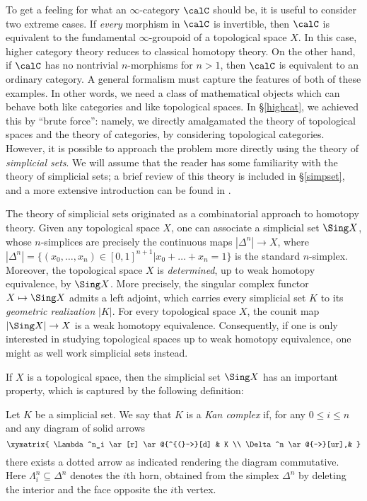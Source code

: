 To get a feeling for what an $\infty$-category $\calC$ should be, it is useful to consider two extreme cases. If {\em every} morphism in $\calC$ is invertible, then $\calC$ is equivalent to the fundamental $\infty$-groupoid of a topological space $X$. In this case, higher category theory reduces to classical homotopy theory. On the other hand, if $\calC$ has no nontrivial $n$-morphisms for $n > 1$, then $\calC$ is equivalent to an ordinary category. A general formalism must capture the features of both of these examples. In other words, we need
a class of mathematical objects which can behave both like categories and like topological spaces. In \S \ref{highcat}, we achieved this by ``brute force'': namely, we directly amalgamated the theory of topological spaces and the theory of categories, by considering topological categories.
However, it is possible to approach the problem more directly using the theory of
{\em simplicial sets}. 
We will assume that the reader has some familiarity with the theory of simplicial sets; a brief review of this theory is included in \S \ref{simpset}, and a more extensive introduction can be found in \cite{goerssjardine}.

The theory of simplicial sets originated as a combinatorial approach to homotopy theory. Given any topological space $X$, one can associate a simplicial set $\Sing X$, whose $n$-simplices are precisely the continuous maps $| \Delta^n | \rightarrow X$, where $|\Delta^n| = \{ (x_0, \ldots, x_n) \in [0,1]^{n+1} | x_0 + \ldots + x_n =1 \}$ is the standard $n$-simplex. Moreover, the topological space $X$ is {\em determined}, up to weak homotopy equivalence, by $\Sing X$. More precisely, the singular complex functor $X \mapsto \Sing X$
admits a left adjoint, which carries every simplicial set $K$ to its {\it geometric realization} $|K|$. For every topological space $X$, the counit map  $| \Sing X | \rightarrow X$ is a weak homotopy equivalence. Consequently, if one is only interested in studying topological spaces up to weak homotopy equivalence, one might as well work simplicial sets instead.

If $X$ is a topological space, then the simplicial set $\Sing X$ has an important property, which is captured by the following definition:

\begin{definition}\label{strongkan}
Let $K$ be a simplicial set. We say that $K$ is a {\it Kan complex} if, for any $0 \leq i \leq n$ and any diagram of solid arrows
$$ \xymatrix{ \Lambda^n_i \ar[r] \ar@{^{(}->}[d] & K \\
\Delta^n \ar@{-->}[ur],& }$$
there exists a dotted arrow as indicated rendering the diagram commutative. Here $\Lambda^n_i \subseteq \Delta^n$ denotes the $i$th horn, obtained from the simplex $\Delta^n$ by deleting the interior and the face opposite the $i$th vertex.
\end{definition}

